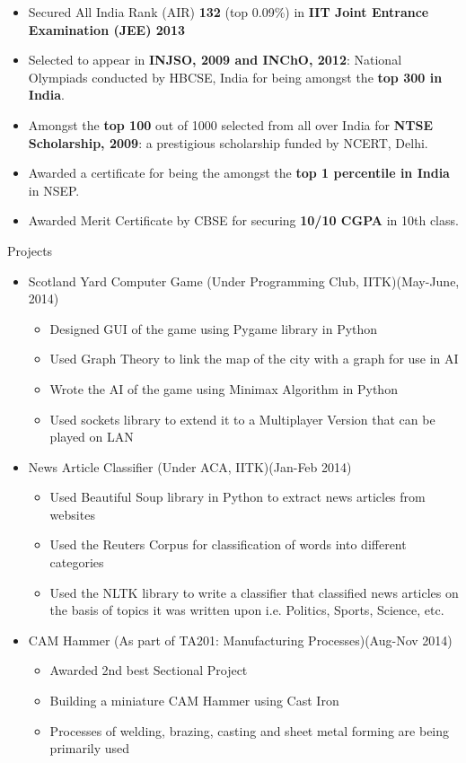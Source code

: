 \documentclass{article}
\begin{document}
	\begin{itemize}
\item Secured All India Rank (AIR) \textbf {132} (top 0.09\%) in \textbf {IIT Joint Entrance Examination (JEE) 2013} 
\item Selected to appear in \textbf{INJSO, 2009 and INChO, 2012}: National Olympiads conducted by HBCSE, India for being amongst the \textbf{top 300 in India}.
\item Amongst the \textbf{top 100} out of 1000 selected from all over India for \textbf{NTSE Scholarship, 2009}: a prestigious scholarship funded by NCERT, Delhi.
\item Awarded a certificate for being the amongst the \textbf{top 1 percentile in India} in  NSEP.
\item Awarded Merit Certificate by CBSE for securing \textbf{10/10 CGPA} in 10th class.
	\end{itemize}
\vspace{10pt}
{\Large Projects}
\begin{itemize}
\item {\large Scotland Yard Computer Game}\newline
(Under Programming Club, IITK)\hfill (May-June, 2014)
	\begin{itemize}
	\item Designed GUI of the game using Pygame library in Python
	\item Used Graph Theory to link the map of the city with a graph for use in AI
	\item Wrote the AI of the game using Minimax Algorithm in Python

	\item Used sockets library to extend it to a Multiplayer Version that can be played on LAN
	\end{itemize}
	
\item {\large News Article Classifier}\newline
(Under ACA, IITK)\hfill (Jan-Feb 2014)
	\begin{itemize}
	\item Used Beautiful Soup library in Python to extract news articles from websites
	\item Used the Reuters Corpus for classification of words into different categories
	\item Used the NLTK library to write a classifier that classified news articles on the basis of topics it was written upon i.e. Politics, Sports, Science, etc.
	\end{itemize}
	
\item {\large CAM Hammer}\newline	
(As part of TA201: Manufacturing Processes)\hfill (Aug-Nov 2014)
	\begin{itemize}
	\item Awarded 2nd best Sectional Project
	\item Building a miniature CAM Hammer using Cast Iron
	\item Processes of welding, brazing, casting and sheet metal forming are being primarily used
	\end{itemize}
	\end{itemize}
\end{document}
